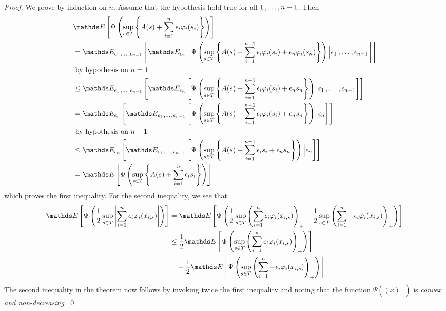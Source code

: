 \documentclass[11pt]{article}
\begin{document}
\begin{itemize}
\begin{proof}
We prove by induction on $n$. Assume that the hypothesis hold true for all $1 \,{,}\ldots{,}\, n-1$. Then
\begin{align*}
&\E{}{\Psi\paren{\sup_{s\in T}\set{A(s) + \sum_{i=1}^n \epsilon_i \varphi_i(s_i)}}}\\
&= \E{\epsilon_1 \xdotx{,} \epsilon_{n-1}}{\E{\epsilon_n}{\Psi\paren{\sup_{s\in T}\set{A(s) + \sum_{i=1}^{n-1} \epsilon_i \varphi_i(s_i) + \epsilon_n \varphi_i(s_n)}} \Big| \epsilon_1 \xdotx{,} \epsilon_{n-1}}}\\
&\text{ by hypothesis on $n=1$}\\
&\le \E{\epsilon_1 \xdotx{,} \epsilon_{n-1}}{\E{\epsilon_n}{\Psi\paren{\sup_{s\in T}\set{A(s) + \sum_{i=1}^{n-1} \epsilon_i \varphi_i(s_i) + \epsilon_n s_n}} \Big| \epsilon_1 \xdotx{,} \epsilon_{n-1}}} \\
&= \E{\epsilon_n}{\E{\epsilon_1 \xdotx{,} \epsilon_{n-1}}{\Psi\paren{\sup_{s\in T}\set{A(s) + \sum_{i=1}^{n-1} \epsilon_i \varphi_i(s_i) + \epsilon_n s_n}} \Big| \epsilon_n }} \\
&\text{ by hypothesis on $n-1$}\\
&\le \E{\epsilon_n}{\E{\epsilon_1 \xdotx{,} \epsilon_{n-1}}{\Psi\paren{\sup_{s\in T}\set{A(s) + \sum_{i=1}^{n-1} \epsilon_i s_i + \epsilon_n s_n}} \Big| \epsilon_n }} \\
&= \E{}{\Psi\paren{\sup_{s\in T}\set{A(s) + \sum_{i=1}^{n} \epsilon_i s_i }}}
\end{align*} which proves the first inequality. For the second inequality, we see that 
\begin{align*}
\E{}{\Psi\paren{\frac{1}{2}\sup_{s\in T}\abs{\sum_{i=1}^n \epsilon_i \varphi_i(x_{i,s})}}} &= \E{}{\Psi\paren{\frac{1}{2}\sup_{s\in T}\paren{\sum_{i=1}^n \epsilon_i \varphi_i(x_{i,s})}_{+} + \frac{1}{2}\sup_{s\in T}\paren{\sum_{i=1}^n - \epsilon_i \varphi_i(x_{i,s})}_{+}}}\\
&\le \frac{1}{2} \E{}{\Psi\paren{\sup_{s\in T}\paren{\sum_{i=1}^n \epsilon_i \varphi_i(x_{i,s})}_{+} }} \\
&\quad  + \frac{1}{2} \E{}{\Psi\paren{\sup_{s\in T}\paren{\sum_{i=1}^n -\epsilon_i \varphi_i(x_{i,s})}_{+} }}
\end{align*} The second inequality in the theorem now follows by invoking twice the first inequality and noting that the function $\Psi((x)_{+})$ is \emph{convex and non-decreasing}. \qed
\end{proof}


\end{itemize}
\end{document}
